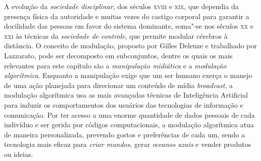 A evolução da \textit{sociedade disciplinar}, dos séculos \textsc{xviii} e \textsc{xix}, que
dependia da presença física da autoridade e muitas vezes do castigo
corporal para garantir a docilidade das pessoas em favor do sistema
dominante, soma"-se nos séculos \textsc{xx} e \textsc{xxi} às técnicas da \textit{sociedade
de controle}, que permite modular cérebros à distância. O conceito de
modulação, proposto por Gilles Deleuze e trabalhado por Lazzarato, pode
ser decomposto em subconjuntos, dentre os quais os mais relevantes para
este capítulo são a \textit{manipulação midiática} e a \textit{modulação
algorítmica}. Enquanto a manipulação exige que um ser humano exerça o
manejo de uma ação planejada para direcionar um conteúdo de mídia
\textit{broadcast}, a modulação algorítmica usa as mais avançadas técnicas
de Inteligência Artificial para induzir os comportamentos dos usuários
das tecnologias de informação e comunicação. Por ter acesso a uma enorme
quantidade de dados pessoais de cada indivíduo e ser gerida por códigos
computacionais, a modulação algorítmica atua de maneira personalizada,
prevendo gostos e preferências de cada um, sendo a tecnologia mais
eficaz para \textit{criar mundos}, gerar \textit{oceanos azuis} e vender
produtos ou ideias.


